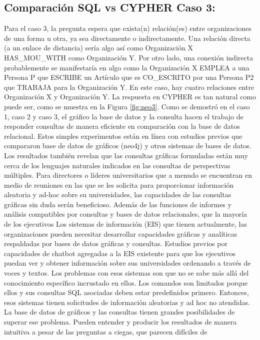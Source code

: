 \subsection{Comparación SQL vs CYPHER Caso 3:}
Para el caso 3, la pregunta espera que exista(n) relación(es)
entre organizaciones de una forma u otra, ya sea directamente
o indirectamente. Una relación directa (a un enlace de distancia) sería algo así como Organización X HAS\_MOU\_WITH como Organización Y. Por otro lado, una conexión indirecta probablemente se manifestaría en algo como la Organización X EMPLEA a una Persona P que ESCRIBE un Artículo que es CO\_ESCRITO por una Persona P2 que TRABAJA para la Organización Y.
En este caso, hay cuatro relaciones entre Organización
X y Organización Y. La respuesta en CYPHER es tan natural
como puede ser, como se muestra en la Figura \ref{fig:neo3}.
Como se demostró en el caso 1, caso 2 y caso 3, el gráfico
la base de datos y la consulta hacen el trabajo de responder consultas
de manera eficiente en comparación con la base de datos relacional. Estos simples experimentos están en línea con estudios previos que compararon
base de datos de gráficos (neo4j) y otros sistemas de bases de datos.
Los resultados también revelan que las consultas gráficas formuladas
están muy cerca de los lenguajes naturales indicados en las consultas de perspectivas múltiples. Para directores o líderes universitarios que
a menudo se encuentran en medio de reuniones en las que se les solicita
para proporcionar información aleatoria y ad-hoc sobre su
universidades, las capacidades de las consultas gráficas sin duda serán
beneficioso.
Además de las funciones de informes y análisis compatibles
por consultas y bases de datos relacionales, que la mayoría de los ejecutivos
Los sistemas de información (EIS) que tienen actualmente, las organizaciones pueden necesitar desarrollar capacidades gráficas y analíticas respaldadas
por bases de datos gráficas y consultas.
Estudios previos por capacidades de chatbot agregadas
a la EIS existente para que los ejecutivos puedan ver y obtener
información sobre sus universidades ordenando a través de
voces y textos. Los problemas con esos sistemas son que no se sabe más allá del conocimiento específico incrustado en ellos.
Los comandos son limitados porque ellos y sus consultas SQL asociadas deben estar predefinidos primero. Entonces, esos sistemas tienen solicitudes de información aleatorias y ad hoc no atendidas.
La base de datos de gráficos y las consultas tienen grandes posibilidades de
superar ese problema. Pueden entender y producir los resultados de manera intuitiva a pesar de las preguntas a ciegas, que parecen difíciles de
